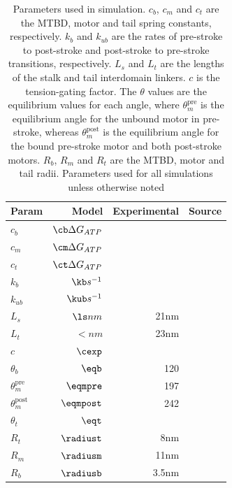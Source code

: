 \documentclass[9pt,twocolumn,twoside]{article}
\begin{document}
\begin{table}
  \centering
  \begin{tabular}{lrrr}
    Param & Model & Experimental & Source \\
    \hline
    $c_b$ & $\cb \Delta G_{ATP}$ &  & \\
    $c_m$ & $\cm \Delta G_{ATP}$ &  & \\
    $c_t$ & $\ct \Delta G_{ATP}$ &  & \\
    $k_b$ & $\kb s^{-1}$&  & \\
    $k_{ub}$ & $\kub s^{-1}$ & & \\
    $L_s$ & $\ls nm$ & 21nm & \cite{burgess-paper, 3vkh-cite, carter-paper}\\
    $L_t$ & $\lt nm$ & 23nm & \cite{burgess-paper, 3vkh-cite, carter-paper}\\
    $c$ & $\cexp$ & & \\
    $\theta_b$ & $\eqb$ &  120 & \cite{leschziner} \\
    $\theta_m^{\mbox{pre}}$ & $\eqmpre$ &  197 & \cite{burgess-paper}\\
    $\theta_m^{\mbox{post}}$ & $\eqmpost$ & 242 & \cite{burgess-paper}\\
    $\theta_t$ & $\eqt$ &  & \\
    $R_t$ & $\radiust$ & 8nm & \cite{burgess-paper}\\
    $R_m$ & $\radiusm$ & 11nm & \cite{burgess-paper}\\
    $R_b$ & $\radiusb$ & 3.5nm & \cite{burgess-paper}\\
    \hline
  \end{tabular}
  \caption{Parameters used in simulation. $c_b$, $c_m$ and $c_t$ are the MTBD, motor and tail spring constants, respectively. $k_b$ and $k_{ub}$ are the rates of pre-stroke to post-stroke and post-stroke to pre-stroke transitions, respectively. $L_s$ and $L_t$ are the lengths of the stalk and tail interdomain linkers. $c$ is the tension-gating factor. The $\theta$ values are the equilibrium values for each angle, where $\theta_m^{\mbox{pre}}$ is the equilibrium angle for the unbound motor in pre-stroke, whereas $\theta_m^{\mbox{post}}$ is the equilibrium angle for the bound pre-stroke motor and both post-stroke motors. $R_b$, $R_m$ and $R_t$ are the MTBD, motor and tail radii. Parameters used for all simulations unless otherwise noted}
  \label{tab:params}
\end{table}
\end{document}
